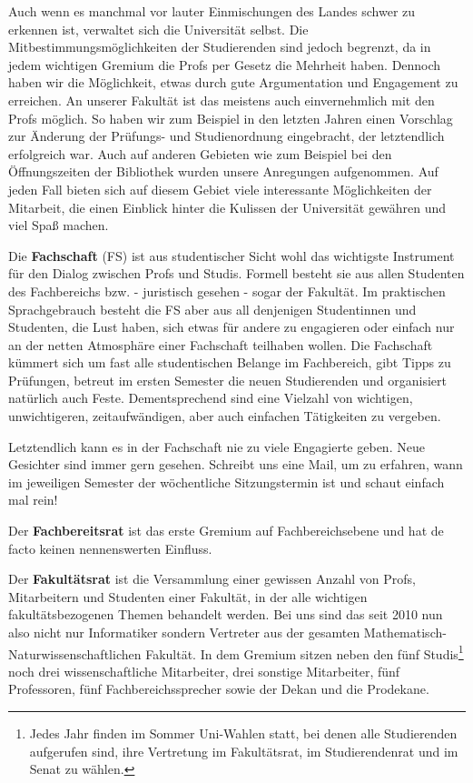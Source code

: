 Auch wenn es manchmal vor lauter Einmischungen des Landes schwer zu erkennen
  ist, verwaltet sich die Universität selbst.  Die Mitbestimmungsmöglichkeiten
  der Studierenden sind jedoch begrenzt, da in jedem wichtigen Gremium die
  Profs per Gesetz die Mehrheit haben.  Dennoch haben wir die Möglichkeit,
  etwas durch gute Argumentation und Engagement zu erreichen. An unserer
  Fakultät ist das meistens auch einvernehmlich mit den Profs möglich.  So
  haben wir zum Beispiel in den letzten Jahren einen Vorschlag zur Änderung der
  Prüfungs- und Studienordnung eingebracht, der letztendlich erfolgreich war.
  Auch auf anderen Gebieten wie zum Beispiel bei den Öffnungszeiten der
  Bibliothek wurden unsere Anregungen aufgenommen. Auf jeden Fall bieten sich
  auf diesem Gebiet viele interessante Möglichkeiten der Mitarbeit, die
  einen Einblick hinter die Kulissen der Universität gewähren und viel Spaß
  machen.

Die \textbf{Fachschaft} (FS) ist aus studentischer Sicht wohl das wichtigste
  Instrument für den Dialog zwischen Profs und Studis.  Formell besteht sie
  aus allen Studenten des Fachbereichs bzw. - juristisch gesehen - sogar der
  Fakultät. Im praktischen Sprachgebrauch besteht die FS aber aus all denjenigen
  Studentinnen und Studenten, die Lust haben, sich etwas für andere zu engagieren
  oder einfach nur an der netten Atmosphäre einer Fachschaft teilhaben wollen.
  Die Fachschaft kümmert sich um fast alle studentischen Belange im Fachbereich,
  gibt Tipps zu Prüfungen, betreut im ersten Semester die neuen Studierenden und
  organisiert natürlich auch Feste.
  Dementsprechend sind eine Vielzahl von wichtigen, unwichtigeren,
  zeitaufwändigen, aber auch einfachen Tätigkeiten zu vergeben.

Letztendlich kann  es in der Fachschaft nie zu viele Engagierte geben. Neue
Gesichter sind immer gern gesehen. Schreibt uns eine Mail, um zu erfahren, wann
im jeweiligen Semester der w\"ochentliche Sitzungstermin ist und schaut einfach
mal rein!

Der \textbf{Fachbereitsrat} ist das erste Gremium auf Fachbereichsebene und hat
de facto keinen nennenswerten Einfluss.

Der \textbf{Fakultätsrat} ist die Versammlung einer gewissen Anzahl von
  Profs, Mitarbeitern und Studenten einer Fakultät, in der alle wichtigen
  fakultätsbezogenen Themen behandelt werden.  Bei uns sind das seit 2010
  nun also nicht nur Informatiker sondern Vertreter aus der gesamten
  Mathematisch- Naturwissenschaftlichen Fakultät.  In dem Gremium sitzen
  neben den fünf Studis\footnote{Jedes Jahr finden im Sommer Uni-Wahlen
  statt, bei denen alle Studierenden aufgerufen sind, ihre Vertretung im
  Fakultätsrat, im Studierendenrat und im Senat zu wählen.} noch drei wissenschaftliche
  Mitarbeiter, drei sonstige Mitarbeiter, fünf Professoren, fünf
  Fachbereichssprecher sowie der Dekan und die Prodekane.


